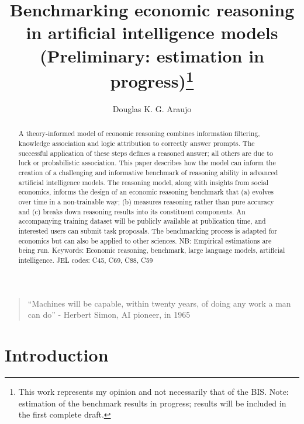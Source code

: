 \documentclass[
]{article}
\title{Benchmarking economic reasoning in artificial intelligence models
(Preliminary: estimation in progress)\thanks{This work represents my
opinion and not necessarily that of the BIS. Note: estimation of the
benchmark results in progress; results will be included in the first
complete draft.}}
\author{Douglas K. G. Araujo}
\affil{%
                  Bank for International
Settlements, douglas.araujo@bis.org
              }
\date{}
\theoremstyle{plain}
\theoremstyle{definition}
\theoremstyle{remark}
\begin{document}
\maketitle
\begin{abstract}
A theory-informed model of economic reasoning combines information
filtering, knowledge association and logic attribution to correctly
answer prompts. The successful application of these steps defines a
reasoned answer; all others are due to luck or probabilistic
association. This paper describes how the model can inform the creation
of a challenging and informative benchmark of reasoning ability in
advanced artificial intelligence models. The reasoning model, along with
insights from social economics, informs the design of an economic
reasoning benchmark that (a) evolves over time in a non-trainable way;
(b) measures reasoning rather than pure accuracy and (c) breaks down
reasoning results into its constituent components. An accompanying
training dataset will be publicly available at publication time, and
interested users can submit task proposals. The benchmarking process is
adapted for economics but can also be applied to other sciences. NB:
Empirical estimations are being run. Keywords: Economic reasoning,
benchmark, large language models, artificial intelligence. JEL codes:
C45, C69, C88, C59
\end{abstract}

\begin{quote}
``Machines will be capable, within twenty years, of doing any work a man
can do'' - Herbert Simon, AI pioneer, in 1965
\end{quote}

\section{Introduction}\label{introduction}
\end{document}
